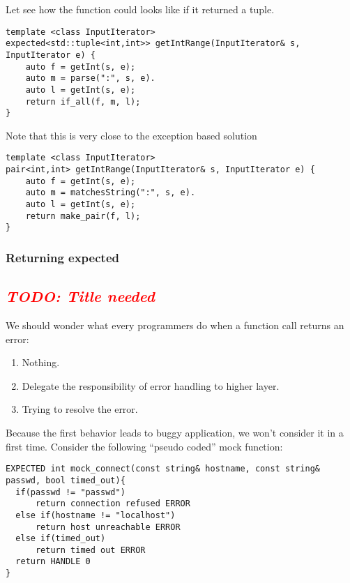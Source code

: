 \documentclass[a4paper,10pt]{article}
\newcommand{\todo}[1]{\emph{\textcolor{red}{TODO: #1}}}
\begin{document}
Let see how the function could looks like if it returned a tuple.

\begin{lstlisting}
template <class InputIterator>
expected<std::tuple<int,int>> getIntRange(InputIterator& s, InputIterator e) {
    auto f = getInt(s, e);
    auto m = parse(":", s, e).
    auto l = getInt(s, e);
    return if_all(f, m, l);
}
\end{lstlisting}

Note that this is very close to the exception based solution

\begin{lstlisting}
template <class InputIterator>
pair<int,int> getIntRange(InputIterator& s, InputIterator e) {
    auto f = getInt(s, e);
    auto m = matchesString(":", s, e).
    auto l = getInt(s, e);       
    return make_pair(f, l);
}
\end{lstlisting}

\subsubsection{Returning expected}



\subsection{\todo{Title needed}}

We should wonder what every programmers do when a function call returns an error:

\begin{enumerate}
 \item Nothing.
 \item Delegate the responsibility of error handling to higher layer.
 \item Trying to resolve the error.
\end{enumerate}

Because the first behavior leads to buggy application, we won't consider it in a first time. Consider the following ``pseudo coded'' mock function:

\begin{lstlisting}
EXPECTED int mock_connect(const string& hostname, const string& passwd, bool timed_out){
  if(passwd != "passwd")
      return connection refused ERROR
  else if(hostname != "localhost")
      return host unreachable ERROR
  else if(timed_out)
      return timed out ERROR
  return HANDLE 0
}
\end{lstlisting}
\end{document}
